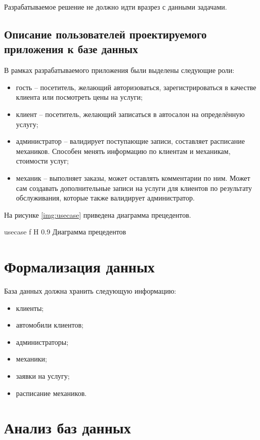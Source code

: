 Разрабатываемое решение не должно идти вразрез с данными задачами. 

\subsection{Описание пользователей проектируемого приложения к базе данных}

В рамках разрабатываемого приложения были выделены следующие роли:

\begin{itemize}
	\item гость -- посетитель, желающий авторизоваться, зарегистрироваться в качестве клиента или посмотреть цены на услуги;
	\item клиент -- посетитель, желающий записаться в автосалон на определённую услугу;
	\item администратор -- валидирует поступающие записи, составляет расписание механиков. Способен менять информацию по клиентам и механикам, стоимости услуг;
	\item механик -- выполняет заказы, может оставлять комментарии по ним. Может сам создавать дополнительные записи на услуги для клиентов по результату обслуживания, которые также валидирует администратор.
\end{itemize}

На рисунке \ref{img:usecase} приведена диаграмма прецедентов.

{usecase}
{f}
{H}
{0.9\textwidth}
{Диаграмма прецедентов}

\section{Формализация данных}

База данных должна хранить следующую информацию:

\begin{itemize}
	\item клиенты;
	\item автомобили клиентов;
	\item администраторы;
	\item механики;
	\item заявки на услугу;
	\item расписание механиков.
\end{itemize}

\section{Анализ баз данных}

